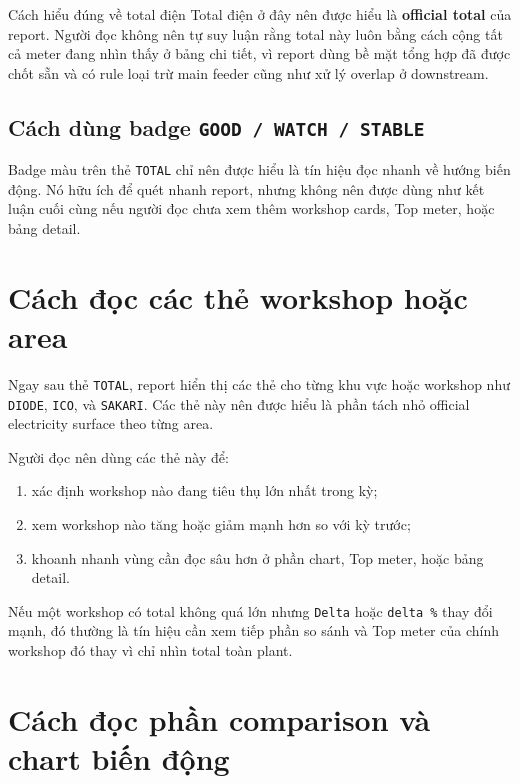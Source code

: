 \begin{ReaderNote}{Cách hiểu đúng về total điện}
Total điện ở đây nên được hiểu là \textbf{official total} của report. Người đọc không nên tự suy luận rằng total này luôn bằng cách cộng tất cả meter đang nhìn thấy ở bảng chi tiết, vì report dùng bề mặt tổng hợp đã được chốt sẵn và có rule loại trừ main feeder cũng như xử lý overlap ở downstream.
\end{ReaderNote}

\subsection{Cách dùng badge \texttt{GOOD / WATCH / STABLE}}

Badge màu trên thẻ \texttt{TOTAL} chỉ nên được hiểu là tín hiệu đọc nhanh về hướng biến động. Nó hữu ích để quét nhanh report, nhưng không nên được dùng như kết luận cuối cùng nếu người đọc chưa xem thêm workshop cards, Top meter, hoặc bảng detail.

\section{Cách đọc các thẻ workshop hoặc area}

Ngay sau thẻ \texttt{TOTAL}, report hiển thị các thẻ cho từng khu vực hoặc workshop như \texttt{DIODE}, \texttt{ICO}, và \texttt{SAKARI}. Các thẻ này nên được hiểu là phần tách nhỏ official electricity surface theo từng area.

Người đọc nên dùng các thẻ này để:

\begin{enumerate}[label=-]
\item xác định workshop nào đang tiêu thụ lớn nhất trong kỳ;
\item xem workshop nào tăng hoặc giảm mạnh hơn so với kỳ trước;
\item khoanh nhanh vùng cần đọc sâu hơn ở phần chart, Top meter, hoặc bảng detail.
\end{enumerate}

Nếu một workshop có total không quá lớn nhưng \texttt{Delta} hoặc \texttt{delta \%} thay đổi mạnh, đó thường là tín hiệu cần xem tiếp phần so sánh và Top meter của chính workshop đó thay vì chỉ nhìn total toàn plant.

\section{Cách đọc phần comparison và chart biến động}

